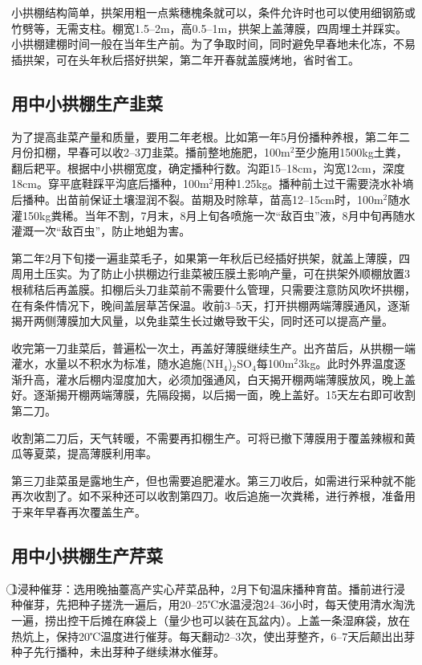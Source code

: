 \documentclass{ctexbook}
\begin{document}
小拱棚结构简单，拱架用粗一点紫穗槐条就可以，条件允许时也可以使用细钢筋或竹劈等，无需支柱。棚宽1.5--2m，高0.5--1m，拱架上盖薄膜，四周埋土并踩实。小拱棚建棚时间一般在当年生产前。为了争取时间，同时避免早春地未化冻，不易插拱架，可在头年秋后搭好拱架，第二年开春就盖膜烤地，省时省工。

\subsection{用中小拱棚生产韭菜}
为了提高韭菜产量和质量，要用二年老根。比如第一年5月份播种养根，第二年二月份扣棚，早春可以收2--3刀韭菜。播前整地施肥，100m$^2$至少施用1500kg土粪，翻后耙平。根据中小拱棚宽度，确定播种行数。沟距15--18cm，沟宽12cm，深度18cm。穿平底鞋踩平沟底后播种，100m$^2$用种1.25kg。播种前土过干需要浇水补墒后播种。出苗前保证土壤湿润不裂。苗期及时除草，苗高12--15cm时，100m$^2$随水灌150kg粪稀。当年不割，7月末，8月上旬各喷施一次“敌百虫”液，8月中旬再随水灌溉一次“敌百虫”，防止地蛆为害。

第二年2月下旬搂一遍韭菜毛子，如果第一年秋后已经插好拱架，就盖上薄膜，四周用土压实。为了防止小拱棚边行韭菜被压膜土影响产量，可在拱架外顺棚放置3根秫秸后再盖膜。扣棚后头刀韭菜前不需要什么管理，只需要注意防风吹坏拱棚，在有条件情况下，晚间盖层草苫保温。收前3--5天，打开拱棚两端薄膜通风，逐渐揭开两侧薄膜加大风量，以免韭菜生长过嫩导致干尖，同时还可以提高产量。

收完第一刀韭菜后，普遍松一次土，再盖好薄膜继续生产。出齐苗后，从拱棚一端灌水，水量以不积水为标准，随水追施(NH$_4$)$_2$SO$_4$每100m$^2$3kg。此时外界温度逐渐升高，灌水后棚内湿度加大，必须加强通风，白天揭开棚两端薄膜放风，晚上盖好。逐渐揭开棚两端薄膜，先隔段揭，以后揭一面，晚上盖好。15天左右即可收割第二刀。

收割第二刀后，天气转暖，不需要再扣棚生产。可将已撤下薄膜用于覆盖辣椒和黄瓜等夏菜，提高薄膜利用率。

第三刀韭菜虽是露地生产，但也需要追肥灌水。第三刀收后，如需进行采种就不能再次收割了。如不采种还可以收割第四刀。收后追施一次粪稀，进行养根，准备用于来年早春再次覆盖生产。

\subsection{用中小拱棚生产芹菜}
\textcircled{1}浸种催芽：选用晚抽薹高产实心芹菜品种，2月下旬温床播种育苗。播前进行浸种催芽，先把种子搓洗一遍后，用20--25℃水温浸泡24--36小时，每天使用清水淘洗一遍，捞出控干后摊在麻袋上（量少也可以装在瓦盆内）。上盖一条湿麻袋，放在热炕上，保持20℃温度进行催芽。每天翻动2--3次，使出芽整齐，6--7天后颠出出芽种子先行播种，未出芽种子继续淋水催芽。
\end{document}
